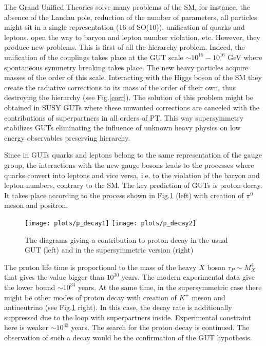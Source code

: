 \documentclass{cernyrep}
\begin{document}
The Grand Unified Theories solve many problems of the SM, for instance, the absence of the Landau pole, reduction of the number of parameters, 
all particles might sit in a single representation (16 of SO(10)), 
unification of quarks and leptons, open the way to baryon and lepton number violation, etc. However, they produce new problems. This is first of all the hierarchy problem. Indeed, the unification of the couplings takes place at the GUT scale $\sim 10^{15}-10^{16}$ GeV where spontaneous symmetry breaking takes place. The new heavy particles acquire masses of the order of this scale. Interacting with the Higgs boson of the SM they create the radiative corrections to its mass of the order of their own, thus destroying the hierarchy (see Fig.\ref{corr}). The solution of this problem might be obtained in SUSY GUTs where these unwanted corrections are canceled
with  the contributions of superpartners in all orders of PT. This way supersymmetry stabilizes GUTs 
eliminating the influence of unknown heavy physics on low energy observables preserving hierarchy.

Since in GUTs quarks and leptons belong to the same representation of the gauge group, the interactions with the new gauge bosons leads to the processes where quarks convert into leptons and vice versa, i.e. to the violation of the baryon and lepton numbers, contrary to the SM. The key prediction of GUTs is proton decay. It takes place according to the process shown in Fig.\ref{proton} (left)  with creation of  $\pi^0$ meson and positron. 
\begin{figure}[htb]
\centering
\texttt{[image: plots/p\_decay1]}\hspace{15pt}
\texttt{[image: plots/p\_decay2]}
\caption{The diagrams giving a contribution to proton decay in the usual GUT (left) and in the supersymmetric version (right)}
\label{proton}
\end{figure}
The proton life time is proportional to the mass of the heavy $X$ boson $\tau_P\sim M_X^4$ that gives the value bigger than $10^{30}$ years. The modern experimental data give the lower bound $\sim 10^{34}$ years. At the same time, in the supersymmetric case there might be other modes of proton decay with creation of $K^+$ meson and  antineutrino (see Fig.\ref{proton} right). In this case, the decay rate is additionally suppressed due to the loop with superpartners inside. Experimental constraint here is weaker $\sim 10^{33}$ years. The search for the proton decay is continued. The observation of such a decay would be the confirmation of the GUT hypothesis.
\clearpage
\end{document}
